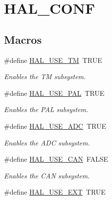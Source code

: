 \hypertarget{group__HAL__CONF}{}\section{H\+A\+L\+\_\+\+C\+O\+N\+F}
\label{group__HAL__CONF}
\subsection*{Macros}
\begin{DoxyCompactItemize}
\item 
\hypertarget{group__HAL__CONF_ga989811956a40f9270a092212a8570632}{}\#define \hyperlink{group__HAL__CONF_ga989811956a40f9270a092212a8570632}{H\+A\+L\+\_\+\+U\+S\+E\+\_\+\+T\+M}~T\+R\+U\+E\label{group__HAL__CONF_ga989811956a40f9270a092212a8570632}

\begin{DoxyCompactList}\small\item\em Enables the T\+M subsystem. \end{DoxyCompactList}\item 
\hypertarget{group__HAL__CONF_ga2311bcc7b41bfba183c9ec1a64a11e93}{}\#define \hyperlink{group__HAL__CONF_ga2311bcc7b41bfba183c9ec1a64a11e93}{H\+A\+L\+\_\+\+U\+S\+E\+\_\+\+P\+A\+L}~T\+R\+U\+E\label{group__HAL__CONF_ga2311bcc7b41bfba183c9ec1a64a11e93}

\begin{DoxyCompactList}\small\item\em Enables the P\+A\+L subsystem. \end{DoxyCompactList}\item 
\hypertarget{group__HAL__CONF_ga413a1b6c0ca2c9e524df50ceac1275fd}{}\#define \hyperlink{group__HAL__CONF_ga413a1b6c0ca2c9e524df50ceac1275fd}{H\+A\+L\+\_\+\+U\+S\+E\+\_\+\+A\+D\+C}~T\+R\+U\+E\label{group__HAL__CONF_ga413a1b6c0ca2c9e524df50ceac1275fd}

\begin{DoxyCompactList}\small\item\em Enables the A\+D\+C subsystem. \end{DoxyCompactList}\item 
\hypertarget{group__HAL__CONF_ga2e351185eace5acfd90b65c9fe796355}{}\#define \hyperlink{group__HAL__CONF_ga2e351185eace5acfd90b65c9fe796355}{H\+A\+L\+\_\+\+U\+S\+E\+\_\+\+C\+A\+N}~F\+A\+L\+S\+E\label{group__HAL__CONF_ga2e351185eace5acfd90b65c9fe796355}

\begin{DoxyCompactList}\small\item\em Enables the C\+A\+N subsystem. \end{DoxyCompactList}\item 
\hypertarget{group__HAL__CONF_ga2dd40c0fdd833b861f9241f6d282fe34}{}\#define \hyperlink{group__HAL__CONF_ga2dd40c0fdd833b861f9241f6d282fe34}{H\+A\+L\+\_\+\+U\+S\+E\+\_\+\+E\+X\+T}~T\+R\+U\+E\label{group__HAL__CONF_ga2dd40c0fdd833b861f9241f6d282fe34}


\end{DoxyCompactItemize}
